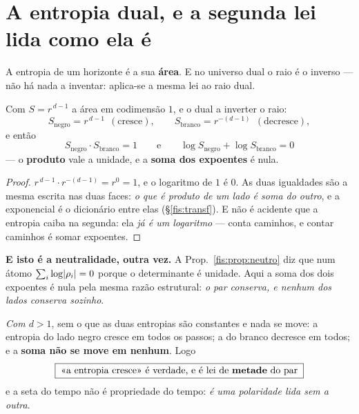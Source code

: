 \documentclass[livro.tex]{subfiles}
\begin{document}
\section{A entropia dual, e a segunda lei lida como ela é}\label{fis:entropiadual}

\noindent A entropia de um horizonte é a sua \textbf{área}. E no universo dual o
raio é o inverso --- não há nada a inventar: aplica-se a mesma lei ao raio dual.

\begin{teorema}\label{fis:thm:entropiadual}
Com $S=r^{\,d-1}$ a área em codimensão $1$, e o dual a inverter o raio:
\[
S_{\text{negro}}=r^{\,d-1}\ \ (\text{cresce}),
\qquad
S_{\text{branco}}=r^{-(d-1)}\ \ (\text{decresce}),
\]
e então
\[
\boxed{\;S_{\text{negro}}\cdot S_{\text{branco}}=1
\qquad\text{e}\qquad
\log S_{\text{negro}}+\log S_{\text{branco}}=0\;}
\]
--- o \textbf{produto} vale a unidade, e a \textbf{soma dos expoentes} é nula.
\end{teorema}

\begin{proof}
$r^{\,d-1}\cdot r^{-(d-1)}=r^{0}=1$, e o logaritmo de $1$ é $0$. As duas
igualdades são a mesma escrita nas duas faces: \emph{o que é produto de um lado é
soma do outro}, e a exponencial é o dicionário entre elas
(§\ref{fis:transf}). E não é acidente que a entropia caiba na segunda: ela
\emph{já é um logaritmo} --- conta caminhos, e contar caminhos é somar expoentes.
\end{proof}

\medskip\noindent\textbf{E isto é a neutralidade, outra vez.} A
Prop.~\ref{fis:prop:neutro} diz que num átomo $\sum_i\log\lvert \rho_i\rvert=0$ porque o
determinante é unidade. Aqui a soma dos dois expoentes é nula pela mesma razão
estrutural: \emph{o par conserva, e nenhum dos lados conserva sozinho}.

\begin{corolario}\label{fis:cor:segundalei}
\emph{Com $d>1$}, sem o que as duas entropias são constantes e nada se move:
a entropia do lado negro cresce em todos os passos; a do branco decresce em
todos; e a \textbf{soma não se move em nenhum}. Logo
\[
\boxed{\;\text{«a entropia cresce» é verdade, e é lei de \textbf{metade} do par}\;}
\]
e a seta do tempo não é propriedade do tempo: \emph{é uma polaridade lida sem a
outra}.
\end{corolario}
\end{document}
